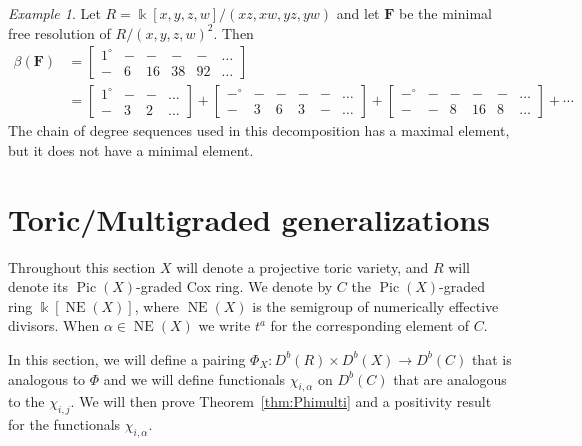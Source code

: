 \documentclass[12pt]{amsart}
\theoremstyle{definition}
\theoremstyle{remark}
\newtheorem{example}[lemma]{Example}
\newcommand{\Pic}{\operatorname{Pic}}
\newcommand{\Cox}{\operatorname{Cox}}
\newcommand{\NE}{\operatorname{NE}}
\newcommand{\irr}{\operatorname{irr}}
\newcommand{\kk}{\Bbbk}
\newcommand{\FF}{\mathbf{F}}
\newcommand{\zp}{\circ}
\begin{document}
\begin{example}
Let $R=\kk[x,y,z,w]/(xz,xw,yz,yw)$ and let $\FF$ be the minimal free resolution of $R/(x,y,z,w)^2$.  Then
\begin{align*}
\beta(\FF)&=\begin{bmatrix}1^\zp&-&-&-&-&\dots \\ -&6&16&38&92&\dots \end{bmatrix}\\
&=\begin{bmatrix}1^\zp&-&-&\dots \\ -&3&2&\dots \end{bmatrix}
+
\begin{bmatrix}-^\zp&-&-&-&-&\dots \\ -&3&6&3&-&\dots \end{bmatrix}
+
\begin{bmatrix}-^\zp&-&-&-&-&\dots \\ -&-&8&16&8&\dots \end{bmatrix}
+
\cdots
\end{align*}
The chain of degree sequences used in this decomposition has a maximal element, but it does not have a minimal element.
\end{example}


\section{Toric/Multigraded generalizations}\label{sec:toric}
Throughout this section $X$ will denote a projective toric variety, and $R$ will denote its
 $\Pic(X)$-graded Cox ring. We denote by $C$  the $\Pic(X)$-graded ring $\kk[\NE(X)]$,
 where $\NE(X)$ is the semigroup of numerically effective divisors. 
 When $\alpha\in \NE(X)$ we write $t^{a}$ for the corresponding element of $C$.

In this section, we will define a pairing $\Phi_{X}: D^{b}(R) \times D^{b}(X) \to D^{b}(C)$ that is analogous to
$\Phi$ and we will define functionals $\chi_{i,\alpha}$ on $D^{b}(C)$ that are analogous to the 
$\chi_{i,j}$.  We will then prove Theorem~\ref{thm:Phimulti} and a positivity result for the functionals $\chi_{i,\alpha}$.


\end{document}
